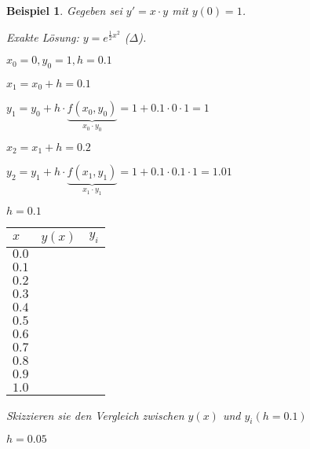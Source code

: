 \documentclass[fontset=ubuntu,12pt,a4paper]{scrreprt}
\newtheorem{beispiel}[defi]{Beispiel}
\begin{document}
\begin{beispiel}
    Gegeben sei \(y'=x\cdot y\) mit \(y(0)=1\).
    
    Exakte Lösung: \(y=e^{\frac{1}{2}x^2}\) (\(\Delta\)).

    \(x_0=0,y_0=1,h=0.1\)

    \(x_1=x_0+h=0.1\)
    
    \(y_1=y_0+h\cdot \underbrace{f(x_0,y_0)}_{x_0\cdot y_0}=1+0.1\cdot 0\cdot 1 = 1\)

    \(x_2=x_1+h=0.2\)
    
    \(y_2=y_1+h\cdot \underbrace{f(x_1,y_1)}_{x_1\cdot y_1}=1+0.1\cdot 0.1\cdot 1 = 1.01\)
    
    \(h=0.1\)

    \begin{tabular}{| l | l | l |}
        \hline
        \(x\) & \(y(x)\) & \(y_i\) \\
        \hline
        \(0.0\) & & \\
        \hline
        \(0.1\) & & \\
        \hline
        \(0.2\) & & \\
        \hline
        \(0.3\) & & \\
        \hline
        \(0.4\) & & \\
        \hline
        \(0.5\) & & \\
        \hline
        \(0.6\) & & \\
        \hline
        \(0.7\) & & \\
        \hline
        \(0.8\) & & \\
        \hline
        \(0.9\) & & \\
        \hline
        \(1.0\) & & \\
        \hline
    \end{tabular}

Skizzieren sie den Vergleich zwischen \(y(x)\) und \(y_i (h=0.1)\)

\(h=0.05\)
\end{beispiel}
\end{document}
